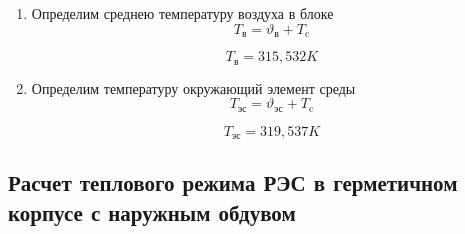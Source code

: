 \begin{enumerate}[label={\arabic*.}]
  \item Определим среднею температуру воздуха в блоке
    \begin{equation}
      T\mathrm{_в} = \vartheta\mathrm{_в} +T\mathrm{_c}
    \end{equation}

    $$T\mathrm{_в} =315,532 K$$
  \item Определим температуру окружающий элемент среды
    \begin{equation}
      T\mathrm{_{эс}} = \vartheta\mathrm{_{эс}} + T\mathrm{_c}
    \end{equation}
    
    $$T\mathrm{_{эс}} = 319,537 K$$
    
\end{enumerate}
\subsection{Расчет теплового режима РЭС в герметичном корпусе с наружным обдувом}
